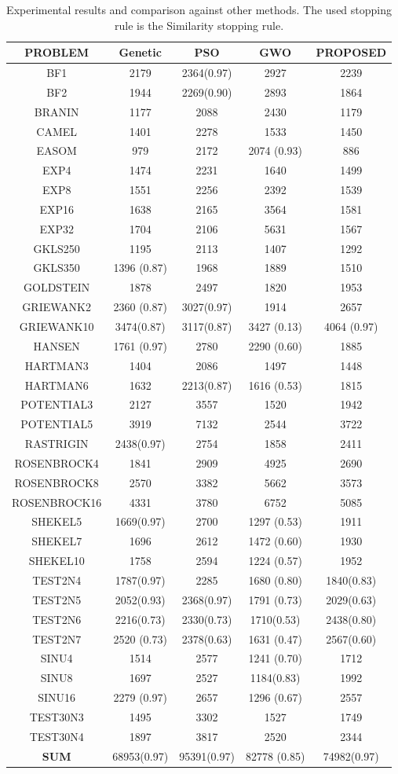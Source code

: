 \documentclass[journal,article,submit,pdftex,moreauthors]{Definitions/mdpi}
\begin{document}
\begin{table}[H]
\caption{ Experimental results and comparison against other methods. The used stopping rule is the Similarity stopping rule.\label{tab:comparison}} 
\begin{centering}
  \begin{tabular}{|c|c|c|c|c|}

\hline 
\textbf{PROBLEM
} & \textbf{Genetic} & 
\textbf{PSO} & \textbf{GWO} &
\textbf{PROPOSED}\tabularnewline
\hline 
BF1 & 2179 & 2364(0.97) & 2927 & 2239 \tabularnewline
\hline 
BF2	& 1944	& 2269(0.90)	& 2893 & 1864
\tabularnewline
\hline 
BRANIN 	& 1177	& 2088	& 	2430 & 1179\tabularnewline
\hline 
CAMEL &	1401 & 2278	& 1533 & 1450 	\tabularnewline
\hline
EASOM &	979 & 2172	& 2074 (0.93) &	886 
\tabularnewline
\hline 
EXP4 	& 1474	& 2231	& 1640 & 1499		
\tabularnewline
\hline 
EXP8 	& 1551 & 2256 &  2392 & 1539		
\tabularnewline
\hline 
EXP16 &	1638	& 2165	&  3564 & 1581	
\tabularnewline
\hline
EXP32 &	1704 & 2106	& 5631 & 1567 	
\tabularnewline
\hline 
GKLS250 	&  1195 & 2113	& 1407 &	1292	
\tabularnewline
\hline 
GKLS350 &	1396 (0.87)	& 1968 & 1889 & 1510	
\tabularnewline
\hline 
GOLDSTEIN 	& 	1878 & 2497& 1820 & 1953
\tabularnewline
\hline 
GRIEWANK2 &	2360 (0.87)	& 3027(0.97) &	1914 & 2657
\tabularnewline
\hline 
GRIEWANK10 &		3474(0.87)	& 3117(0.87) & 3427 (0.13) & 4064 (0.97)
\tabularnewline
\hline 
HANSEN &	1761 (0.97) &	2780	& 2290 (0.60) & 1885
\tabularnewline
\hline 
HARTMAN3 &	1404 & 2086	 & 1497 & 1448 
\tabularnewline
\hline 
HARTMAN6 &	1632	&	2213(0.87)	&	1616 (0.53) &1815
\tabularnewline
\hline 
POTENTIAL3 	& 2127 & 3557	&	1520 &1942 
\tabularnewline
\hline 
POTENTIAL5 &		3919	& 7132 & 2544 & 3722	
\tabularnewline
\hline 
RASTRIGIN &	2438(0.97) 	&	2754 &	1858& 2411
\tabularnewline
\hline 
ROSENBROCK4 &	1841 & 2909 &	 4925 &2690	
\tabularnewline
\hline 
ROSENBROCK8 &	2570	& 3382 &5662 &	3573
\tabularnewline
\hline 
ROSENBROCK16 &	4331 & 3780	&6752 &	5085
\tabularnewline
\hline 
SHEKEL5 &	1669(0.97)	&	2700 &	1297 (0.53) &1911	
\tabularnewline
\hline 
SHEKEL7 &		1696	 & 2612 &	1472 (0.60) &1930	
\tabularnewline
\hline 
SHEKEL10 &		1758 & 2594 &	1224 (0.57) & 1952	
\tabularnewline
\hline 
TEST2N4 &	1787(0.97) &	2285	&	1680 (0.80) &1840(0.83)
\tabularnewline
\hline 
TEST2N5 &	2052(0.93)	&	2368(0.97) &	1791 (0.73)& 2029(0.63)
\tabularnewline
\hline 
TEST2N6 &	2216(0.73) &	2330(0.73)	&	1710(0.53) & 2438(0.80)
\tabularnewline
\hline 
TEST2N7	&  2520 (0.73) & 2378(0.63)	&	1631 (0.47) &2567(0.60)
\tabularnewline
\hline 
SINU4 &	1514 & 2577 &	 1241 (0.70) & 1712 
\tabularnewline
\hline 
SINU8 &	1697 & 2527	&	1184(0.83)&1992 
\tabularnewline
\hline 
SINU16 	& 2279 (0.97)	&	2657 &	1296 (0.67)&2557	
\tabularnewline
\hline 
TEST30N3 	& 1495 & 3302 &	 1527 & 1749	
\tabularnewline
\hline 
TEST30N4  &	1897  & 3817	&	2520 & 2344
\tabularnewline
\hline 
\textbf{SUM}  &	68953(0.97)	&	95391(0.97)	&	82778 (0.85)&74982(0.97)
 \tabularnewline
\hline 
\end{tabular}
\par\end{centering}
\end{table}
\end{document}
